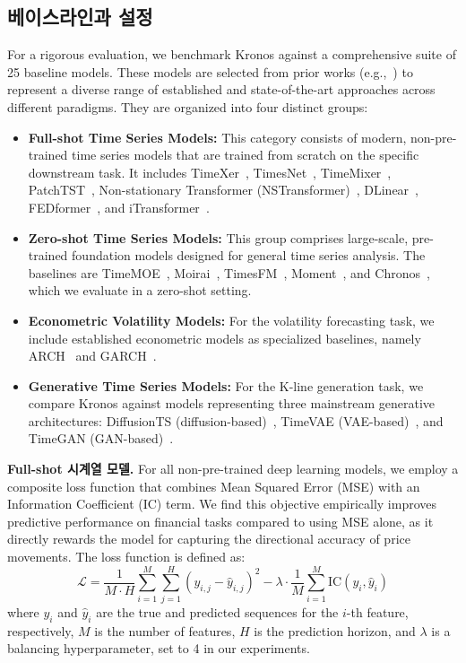 \subsection{베이스라인과 설정}
For a rigorous evaluation, we benchmark Kronos against a comprehensive suite of 25 baseline models. These models are selected from prior works (e.g.,~\cite{xiaoming2025time,wang2024deep,yuan2024diffusion}) to represent a diverse range of established and state-of-the-art approaches across different paradigms. They are organized into four distinct groups:
\begin{itemize}
    \item \textbf{Full-shot Time Series Models:} This category consists of modern, non-pre-trained time series models that are trained from scratch on the specific downstream task. It includes TimeXer~\cite{wang2024timexer}, TimesNet~\cite{wu2022timesnet}, TimeMixer~\cite{wang2024timemixer}, PatchTST~\cite{nie2022time}, Non-stationary Transformer (NSTransformer)~\cite{liu2022non}, DLinear~\cite{zeng2023transformers}, FEDformer~\cite{zhou2022fedformer}, and iTransformer~\cite{liuitransformer}.
    \item \textbf{Zero-shot Time Series Models:} This group comprises large-scale, pre-trained foundation models designed for general time series analysis. The baselines are TimeMOE~\cite{xiaoming2025time}, Moirai~\cite{woo2024unified}, TimesFM~\cite{das2024decoder}, Moment~\cite{goswami2024moment}, and Chronos~\cite{ansari2024chronos}, which we evaluate in a zero-shot setting.
    \item \textbf{Econometric Volatility Models:} For the volatility forecasting task, we include established econometric models as specialized baselines, namely ARCH~\cite{engle1982autoregressive} and GARCH~\cite{bollerslev1986generalized}.
    \item \textbf{Generative Time Series Models:} For the K-line generation task, we compare Kronos against models representing three mainstream generative architectures: DiffusionTS (diffusion-based)~\cite{yuan2024diffusion}, TimeVAE (VAE-based)~\cite{desai2021timevae}, and TimeGAN (GAN-based)~\cite{yoon2019time}.
\end{itemize}

\noindent\textbf{Full-shot 시계열 모델.}
For all non-pre-trained deep learning models, we employ a composite loss function that combines Mean Squared Error (MSE) with an Information Coefficient (IC) term. We find this objective empirically improves predictive performance on financial tasks compared to using MSE alone, as it directly rewards the model for capturing the directional accuracy of price movements. The loss function is defined as:
\begin{equation}
\mathcal{L} = \frac{1}{M \cdot H} \sum_{i=1}^{M} \sum_{j=1}^{H} (y_{i,j} - \hat{y}_{i,j})^2 - \lambda \cdot \frac{1}{M} \sum_{i=1}^{M} \text{IC}(y_i, \hat{y}_i)
\end{equation}
where $y_i$ and $\hat{y}_i$ are the true and predicted sequences for the $i$-th feature, respectively, $M$ is the number of features, $H$ is the prediction horizon, and $\lambda$ is a balancing hyperparameter, set to 4 in our experiments.

